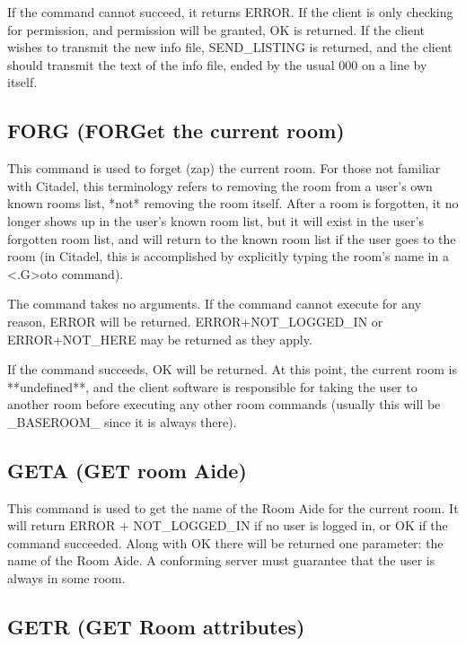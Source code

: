  If the command cannot succeed, it returns ERROR.
 If the client is only checking for permission, and permission will be
granted, OK is returned.
 If the client wishes to transmit the new info file, SEND_LISTING is
returned, and the client should transmit the text of the info file, ended
by the usual 000 on a line by itself.



\subsection{FORG (FORGet the current room)}

 This command is used to forget (zap) the current room.  For those not
familiar with Citadel, this terminology refers to removing the room from
a user's own known rooms list, *not* removing the room itself.  After a
room is forgotten, it no longer shows up in the user's known room list,
but it will exist in the user's forgotten room list, and will return to the
known room list if the user goes to the room (in Citadel, this is
accomplished by explicitly typing the room's name in a <.G>oto command).

 The command takes no arguments.  If the command cannot execute for any
reason, ERROR will be returned.  ERROR+NOT_LOGGED_IN or ERROR+NOT_HERE may
be returned as they apply.

 If the command succeeds, OK will be returned.  At this point, the current
room is **undefined**, and the client software is responsible for taking
the user to another room before executing any other room commands (usually
this will be _BASEROOM_ since it is always there).



\subsection{GETA (GET room Aide)}

 This command is used to get the name of the Room Aide for the current room.
It will return ERROR + NOT_LOGGED_IN if no user is logged in, or OK if the
command succeeded.  Along with OK there will be returned one parameter: the
name of the Room Aide.  A conforming server must guarantee that the user is
always in some room.



\subsection{GETR (GET Room attributes)}

